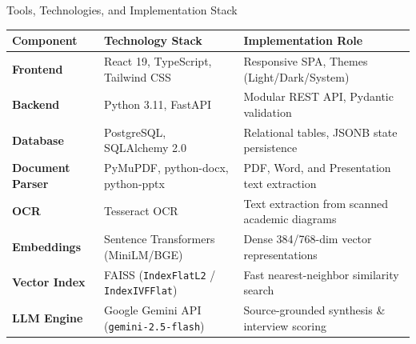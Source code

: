 \documentclass[aspectratio=169,10pt]{beamer}
\begin{document}
\begin{frame}{Tools, Technologies, and Implementation Stack}
  \begin{table}[]
    \centering
    \small
    \begin{tabular}{lll}
      \toprule
      \textbf{Component} & \textbf{Technology Stack} & \textbf{Implementation Role} \\
      \midrule
      \textbf{Frontend} & React 19, TypeScript, Tailwind CSS & Responsive SPA, Themes (Light/Dark/System) \\
      \textbf{Backend} & Python 3.11, FastAPI & Modular REST API, Pydantic validation \\
      \textbf{Database} & PostgreSQL, SQLAlchemy 2.0 & Relational tables, JSONB state persistence \\
      \textbf{Document Parser} & PyMuPDF, python-docx, python-pptx & PDF, Word, and Presentation text extraction \\
      \textbf{OCR} & Tesseract OCR & Text extraction from scanned academic diagrams \\
      \textbf{Embeddings} & Sentence Transformers (MiniLM/BGE) & Dense 384/768-dim vector representations \\
      \textbf{Vector Index} & FAISS (\texttt{IndexFlatL2} / \texttt{IndexIVFFlat}) & Fast nearest-neighbor similarity search \\
      \textbf{LLM Engine} & Google Gemini API (\texttt{gemini-2.5-flash}) & Source-grounded synthesis \& interview scoring \\
      \bottomrule
    \end{tabular}
  \end{table}
\end{frame}
\end{document}
